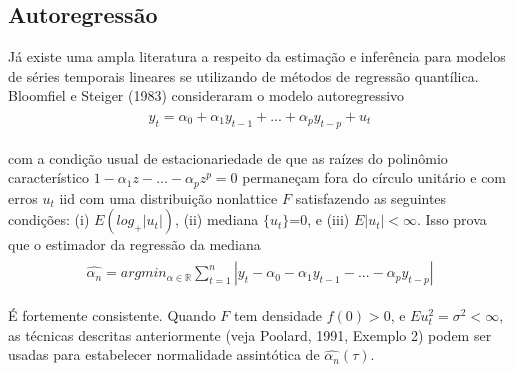 \documentclass[paper=a4, fontsize=11pt]{scrartcl}
\numberwithin{equation}{section}		%
\numberwithin{figure}{section}			%
\numberwithin{table}{section}				%
\begin{document}
\subsection{Autoregressão}
Já existe uma ampla literatura a respeito da estimação e inferência para modelos de séries temporais lineares se utilizando de métodos de regressão quantílica. Bloomfiel e Steiger (1983) consideraram o modelo autoregressivo
\vspace{-10pt}
\begin{align} 
	\begin{split}
	y_{t}=\alpha_{0}+\alpha_{1}y_{t-1}+...+\alpha_{p} y_{t-p}+u_{t} \label{eq:modelo_AR}
	\end{split}					
\end{align}

{\parindent0pt com a condição usual de estacionariedade de que as raízes do polinômio característico $1-\alpha_{1}z-...-\alpha_{p}z^{p}=0$ permaneçam fora do círculo unitário e com erros $u_{t}$ iid com uma distribuição nonlattice $F$ satisfazendo as seguintes condições: (i) $E(log_{+}|{u_{t}|})$}, (ii) mediana $\{u_{t}\}$=0, e (iii) $E|u_{t}| < \infty$. Isso prova que o estimador da regressão da mediana
\vspace{-10pt}
\begin{align} 
	\begin{split}
	\hat{\alpha_{n}}=argmin_{\alpha \in \mathbb{R}} \sum_{t=1}^{n}|y_{t}-\alpha_{0}-\alpha_{1}y_{t-1}-...-\alpha_{p} y_{t-p}|  \label{eq:modelo_AR}
	\end{split}					
\end{align}

{\parindent0pt É fortemente consistente. Quando $F$ tem densidade $f(0)>0$, e $Eu_{t}^2=\sigma^2<\infty$, as técnicas descritas anteriormente (veja Poolard, 1991, Exemplo 2) podem ser usadas para estabelecer normalidade assintótica de $\hat{\alpha_{n}}(\tau)$.}
\end{document}
